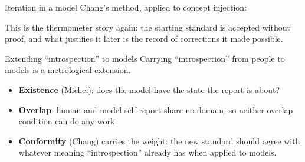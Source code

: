 \documentclass[aspectratio=169,11pt]{beamer}
\begin{document}
\begin{frame}[label=itermodel]{Iteration in a model}
Chang's method, applied to concept injection:

\vspace{0.4em}
\begin{center}
\end{center}

\vspace{0.5em}
{\small This is the thermometer story again: the starting standard is accepted without proof, and what justifies it later is the record of corrections it made possible.}
\end{frame}

\begin{frame}[label=extmodel]{Extending ``introspection'' to models}
Carrying ``introspection'' from people to models is a metrological extension.

\vspace{0.5em}
\begin{center}
\end{center}

\vspace{0.5em}
\begin{itemize}\setlength\itemsep{5pt}
  \item {\small \textbf{Existence} (Michel): does the model have the state the report is about?}
  \item {\small \textbf{Overlap}: human and model self-report share no domain, so neither overlap condition can do any work.}
  \item {\small \textbf{Conformity} (Chang) carries the weight: the new standard should agree with whatever meaning ``introspection'' already has when applied to models.}
\end{itemize}
\end{frame}
\end{document}
